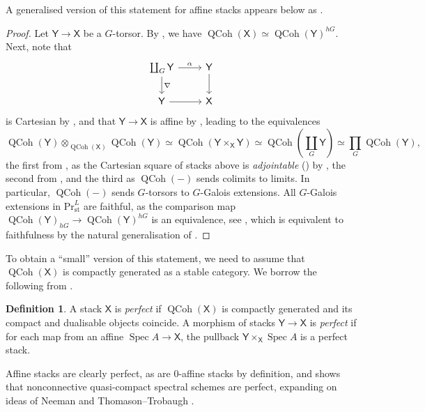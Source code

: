 \documentclass[11pt, a4paper]{article}
\newcommand{\st}{\mathrm{st}}
\DeclareMathOperator{\Spec}{Spec}
\newcommand{\1}{\mathbf{1}}
\newcommand{\PrLst}{{\mathrm{Pr}^L_\st}}
\DeclareMathOperator{\QCoh}{QCoh}
\newcommand{\X}{\mathsf{X}}
\newcommand{\Y}{\mathsf{Y}}
\newcommand{\al}{\alpha}
\theoremstyle{plain}
\theoremstyle{definition}
\newtheorem{mydef}[equation]{Definition}
\theoremstyle{remark}\numberwithin{equation}{section}
\begin{document}
A generalised version of this statement for affine stacks appears below as .

\begin{proof}
    Let $\Y \to \X$ be a $G$-torsor. By , we have $\QCoh(\X) \simeq \QCoh(\Y)^{hG}$. Next, note that
    \[\begin{tikzcd}
        {\coprod_G \Y}\ar[r, "{\al}"]\ar[d, "\nabla"]   &   {\Y}\ar[d]  \\
        {\Y}\ar[r]                                      &   {\X}
    \end{tikzcd}\]
    is Cartesian by , and that $\Y \to \X$ is affine by , leading to the equivalences
    \[\QCoh(\Y)\otimes_{\QCoh(\X)} \QCoh(\Y) \simeq \QCoh(\Y \times_\X \Y) \simeq  \QCoh(\coprod_G \Y) \simeq \prod_G \QCoh(\Y),\]
    the first from \cite[Pr.2.2.1.11]{reconstruction}, as the Cartesian square of stacks above is \emph{adjointable} (\cite[Def.2.2.1.8]{reconstruction}) by \cite[Pr.2.2.2.5]{reconstruction}, the second from , and the third as $\QCoh(-)$ sends colimits to limits. In particular, $\QCoh(-)$ sends $G$-torsors to $G$-Galois extensions. All $G$-Galois extensions in $\PrLst$ are faithful, as the comparison map $\QCoh(\Y)_{hG} \to \QCoh(\Y)^{hG}$ is an equivalence, see \cite[Pr.2.26]{categorical_ambidexterity_shay}, which is equivalent to faithfulness by the natural generalisation of \cite[Pr.6.3.3]{johnrognessdualisinggorups}.
\end{proof}

To obtain a ``small'' version of this statement, we need to assume that $\QCoh(\X)$ is compactly generated as a stable category. We borrow the following from \cite[Pr.3.9]{perfectstacks}.

\begin{mydef}
    A stack $\X$ is \emph{perfect} if $\QCoh(\X)$ is compactly generated and its compact and dualisable objects coincide. A morphism of stacks $\Y \to \X$ is \emph{perfect} if for each map from an affine $\Spec A \to \X$, the pullback $\Y \times_\X \Spec A$ is a perfect stack.
\end{mydef}

Affine stacks are clearly perfect, as are $0$-affine stacks by definition, and \cite[Pr.3.19]{perfectstacks} shows that nonconnective quasi-compact spectral schemes are perfect, expanding on ideas of Neeman \cite{neeman_grothendieck_duality} and Thomason--Trobaugh \cite{thomasontrobaugh}.
\end{document}
